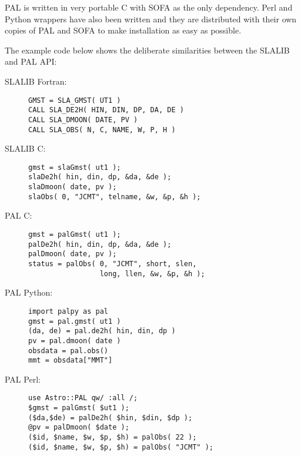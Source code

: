 \documentclass[11pt,twoside]{article}
\begin{document}
PAL is written in very portable C with SOFA as the only
dependency. Perl and Python wrappers have also been written and they
are distributed with their own copies of PAL and SOFA to make
installation as easy as possible.

The example code below shows the deliberate similarities between the
SLALIB and PAL API:

\newpage
\begin{description}

\item[SLALIB Fortran:] \mbox{}

\begin{verbatim}
GMST = SLA_GMST( UT1 )
CALL SLA_DE2H( HIN, DIN, DP, DA, DE )
CALL SLA_DMOON( DATE, PV )
CALL SLA_OBS( N, C, NAME, W, P, H )
\end{verbatim}

\item[SLALIB C:] \mbox{}

\begin{verbatim}
gmst = slaGmst( ut1 );
slaDe2h( hin, din, dp, &da, &de );
slaDmoon( date, pv );
slaObs( 0, "JCMT", telname, &w, &p, &h );
\end{verbatim}

\item[PAL C:] \mbox{}

\begin{verbatim}
gmst = palGmst( ut1 );
palDe2h( hin, din, dp, &da, &de );
palDmoon( date, pv );
status = palObs( 0, "JCMT", short, slen,
                 long, llen, &w, &p, &h );
\end{verbatim}

\item[PAL Python:] \mbox{}

\begin{verbatim}
import palpy as pal
gmst = pal.gmst( ut1 )
(da, de) = pal.de2h( hin, din, dp )
pv = pal.dmoon( date )
obsdata = pal.obs()
mmt = obsdata["MMT"]
\end{verbatim}

\item[PAL Perl:] \mbox{}

\begin{verbatim}
use Astro::PAL qw/ :all /;
$gmst = palGmst( $ut1 );
($da,$de) = palDe2h( $hin, $din, $dp );
@pv = palDmoon( $date );
($id, $name, $w, $p, $h) = palObs( 22 );
($id, $name, $w, $p, $h) = palObs( "JCMT" );

\end{verbatim}

\end{description}
\end{document}
